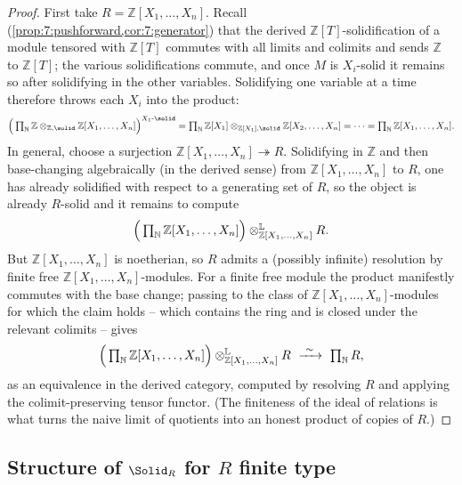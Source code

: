 \begin{proof}
First take $R=\mathbb{Z}[X_{1},\dots,X_{n}]$. Recall (\cref{prop:7:pushforward,cor:7:generator}) that the derived $\mathbb{Z}[T]$-solidification of a module
tensored with $\mathbb{Z}[T]$ commutes with all limits and colimits and sends
$\mathbb{Z}$ to $\mathbb{Z}[T]$; the various solidifications commute, and once
$M$ is $X_{i}$-solid it remains so after solidifying in the other variables.
Solidifying one variable at a time therefore throws each $X_{i}$ into the
product:
\begin{equation*}
\Bigl(\,\textstyle\prod_{\mathbb{N}}\mathbb{Z}\otimes_{\mathbb{Z},\solid}
\mathbb{Z}[X_{1},\dots,X_{n}]\Bigr)^{X_{1}\text{-}\solid}
=\textstyle\prod_{\mathbb{N}}\mathbb{Z}[X_{1}]\otimes_{\mathbb{Z}[X_{1}],\solid}
\mathbb{Z}[X_{2},\dots,X_{n}]=\cdots=\textstyle\prod_{\mathbb{N}}\mathbb{Z}
[X_{1},\dots,X_{n}].
\end{equation*}
In general, choose a surjection $\mathbb{Z}[X_{1},\dots,X_{n}]\twoheadrightarrow
R$. Solidifying in $\mathbb{Z}$ and then base-changing algebraically (in the
derived sense) from $\mathbb{Z}[X_{1},\dots,X_{n}]$ to $R$, one has already
solidified with respect to a generating set of $R$, so the object is already
$R$-solid and it remains to compute
\begin{equation*}
\Bigl(\,\textstyle\prod_{\mathbb{N}}\mathbb{Z}[X_{1},\dots,X_{n}]\Bigr)\otimes^{
\mathbb{L}}_{\mathbb{Z}[X_{1},\dots,X_{n}]}R.
\end{equation*}
But $\mathbb{Z}[X_{1},\dots,X_{n}]$ is noetherian, so $R$ admits a (possibly
infinite) resolution by finite free $\mathbb{Z}[X_{1},\dots,X_{n}]$-modules.
For a finite free module the product manifestly commutes with the base change;
passing to the class of $\mathbb{Z}[X_{1},\dots,X_{n}]$-modules for which the
claim holds -- which contains the ring and is closed under the relevant
colimits -- gives
\begin{equation*}
\Bigl(\,\textstyle\prod_{\mathbb{N}}\mathbb{Z}[X_{1},\dots,X_{n}]\Bigr)\otimes^{
\mathbb{L}}_{\mathbb{Z}[X_{1},\dots,X_{n}]}R\ \xrightarrow{\ \sim\ }\
\textstyle\prod_{\mathbb{N}}R,
\end{equation*}
as an equivalence in the derived category, computed by resolving $R$ and
applying the colimit-preserving tensor functor. (The finiteness of the ideal
of relations is what turns the naive limit of quotients into an honest product
of copies of $R$.)
\end{proof}

\subsection{Structure of \texorpdfstring{$\Solid_{R}$}{Solid\_R} for \texorpdfstring{$R$}{R} finite type}


